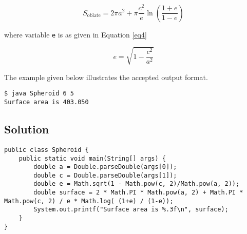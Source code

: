 \begin{equation}
S_{\text{oblate}} = 2\pi a^2 + \pi \frac{c^2}{e} \ln \left(\frac{1+e}{1-e} \right)
\label{eq3}
\end{equation}

where variable \texttt{e} is as given in Equation \ref{eq4}

\begin{equation}
e = \sqrt{1 - \frac{c^2}{a^2}}
\label{eq4}
\end{equation}

The example given below illustrates the accepted output format.

\begin{verbatim}
$ java Spheroid 6 5
Surface area is 403.050
\end{verbatim}

\subsection*{Solution}
\lstset{language=Java,tabsize=2}
\begin{lstlisting}
public class Spheroid {
	public static void main(String[] args) {
		double a = Double.parseDouble(args[0]);
		double c = Double.parseDouble(args[1]);
		double e = Math.sqrt(1 - Math.pow(c, 2)/Math.pow(a, 2));
		double surface = 2 * Math.PI * Math.pow(a, 2) + Math.PI * Math.pow(c, 2) / e * Math.log( (1+e) / (1-e));
		System.out.printf("Surface area is %.3f\n", surface);
	}
}
\end{lstlisting}
